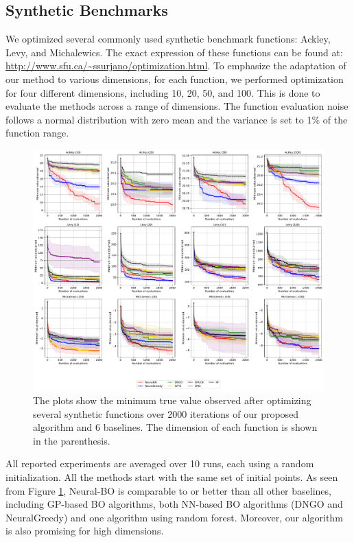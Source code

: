 \subsection{Synthetic Benchmarks}
We optimized several commonly used synthetic benchmark functions: Ackley, Levy, and Michalewics. The exact expression of these functions can be found at: \url{http://www.sfu.ca/~ssurjano/optimization.html}. To emphasize the adaptation of our method to various dimensions, for each function, we performed optimization for four different dimensions, including 10, 20, 50, and 100. This is done to evaluate the methods across a range of dimensions. The function evaluation noise follows a normal distribution with zero mean and the variance is set to 1\% of the function range.
\begin{figure}[H]
    \centering
    \includegraphics[width=\textwidth]{Figures/Neural-BO/Neural-BO_synthetic_function.pdf}
    \caption{The plots show the minimum true value observed after optimizing several synthetic functions over 2000 iterations of our proposed algorithm and 6 baselines. The dimension of each function is shown in the parenthesis.}
    \label{fig:neural-bo_synthetic}
\end{figure}

All reported experiments are averaged over 10 runs, each using a random initialization. All the methods start with the same set of initial points. As seen from Figure \ref{fig:neural-bo_synthetic}, Neural-BO is comparable to or better than all other baselines, including GP-based BO algorithms, both NN-based BO algorithms (DNGO and NeuralGreedy) and one algorithm using random forest. Moreover, our algorithm is also promising for high dimensions. 



